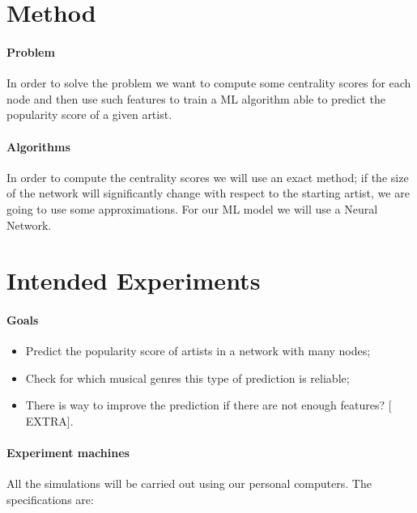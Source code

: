 \documentclass[paper=a4, fontsize=11pt]{scrartcl}
\numberwithin{equation}{section}		%
\numberwithin{figure}{section}			%
\numberwithin{table}{section}			%
\begin{document}
\section*{\textcolor{NavyBlue}{Method}}
\paragraph{\textbf{\textcolor{NavyBlue}{Problem}}} In order to solve the problem we want to compute some centrality scores for each node and then use such features to train a ML algorithm able to predict the popularity score of a given artist. 
\paragraph{\textbf{\textcolor{NavyBlue}{Algorithms}}} In order to compute the centrality scores we will use an exact method; if the size of the network will significantly change with respect to the starting artist, we are going to use some approximations. For our ML model we will use a Neural Network.

\section*{\textcolor{NavyBlue}{Intended Experiments}}
\paragraph{\textbf{\textcolor{NavyBlue}{Goals}}}
  
\begin{itemize}
	\item Predict the popularity score of artists in a network with many nodes;
    \item Check for which musical genres this type of prediction is reliable;
    \item There is way to improve the prediction if there are not enough features? $[$EXTRA$]$. 
\end{itemize}
\paragraph{\textbf{\textcolor{NavyBlue}{Experiment machines}}}
All the simulations will be carried out using our personal computers. The specifications are:
\begin{table}[hb]
\renewcommand{\arraystretch}{2}
\centering
{}
\end{table}


\end{document}
